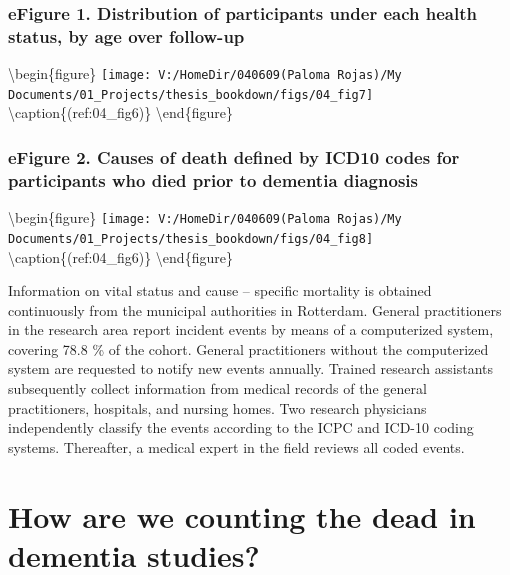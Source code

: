 \documentclass[
]{book}
\begin{document}
\newpage

\hypertarget{efigure-1.-distribution-of-participants-under-each-health-status-by-age-over-follow-up}{%
\subsection{eFigure 1. Distribution of participants under each health status, by age over follow-up}\label{efigure-1.-distribution-of-participants-under-each-health-status-by-age-over-follow-up}}

\textbackslash begin\{figure\}
\texttt{[image: V:/HomeDir/040609(Paloma Rojas)/My Documents/01\_Projects/thesis\_bookdown/figs/04\_fig7]} \textbackslash caption\{(ref:04\_fig6)\}\label{fig:unnamed-chunk-7}
\textbackslash end\{figure\}

\newpage

\hypertarget{efigure-2.-causes-of-death-defined-by-icd10-codes-for-participants-who-died-prior-to-dementia-diagnosis}{%
\subsection{eFigure 2. Causes of death defined by ICD10 codes for participants who died prior to dementia diagnosis}\label{efigure-2.-causes-of-death-defined-by-icd10-codes-for-participants-who-died-prior-to-dementia-diagnosis}}

\textbackslash begin\{figure\}
\texttt{[image: V:/HomeDir/040609(Paloma Rojas)/My Documents/01\_Projects/thesis\_bookdown/figs/04\_fig8]} \textbackslash caption\{(ref:04\_fig6)\}\label{fig:unnamed-chunk-8}
\textbackslash end\{figure\}

Information on vital status and cause -- specific mortality is obtained continuously from the municipal authorities in Rotterdam. General practitioners in the research area report incident events by means of a computerized system, covering 78.8 \% of the cohort. General practitioners without the computerized system are requested to notify new events annually. Trained research assistants subsequently collect information from medical records of the general practitioners, hospitals, and nursing homes. Two research physicians independently classify the events according to the ICPC and ICD-10 coding systems. Thereafter, a medical expert in the field reviews all coded events.

\hypertarget{chapter5}{%
\chapter{How are we counting the dead in dementia studies?}\label{chapter5}}
\end{document}
